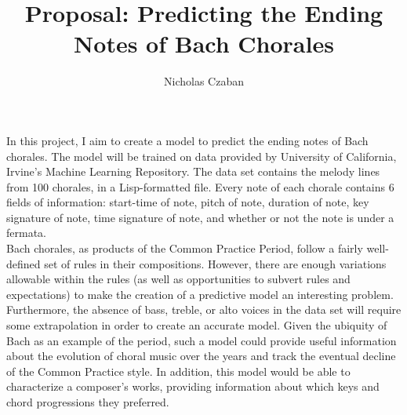 \documentclass[12pt]{article}
\begin{document}
\title{Proposal: Predicting the Ending Notes of Bach Chorales}
\author{Nicholas Czaban}
\maketitle

In this project, I aim to create a model to predict the ending notes of Bach chorales. The model will be trained on data provided by University of California, Irvine's Machine Learning Repository. The data set contains the melody lines from 100 chorales, in a Lisp-formatted file. Every note of each chorale contains 6 fields of information: start-time of note, pitch of note, duration of note, key signature of note, time signature of note, and whether or not the note is under a fermata.\\

Bach chorales, as products of the Common Practice Period, follow a fairly well-defined set of rules in their compositions. However, there are enough variations allowable within the rules (as well as opportunities to subvert rules and expectations) to make the creation of a predictive model an interesting problem. Furthermore, the absence of bass, treble, or alto voices in the data set will require some extrapolation in order to create an accurate model. Given the ubiquity of Bach as an example of the period, such a model could provide useful information about the evolution of choral music over the years and track the eventual decline of the Common Practice style. In addition, this model would be able to characterize a composer's works, providing information about which keys and chord progressions they preferred.\\
\end{document}
